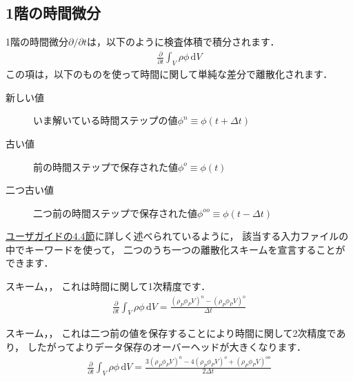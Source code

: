 \subsection{1階の時間微分}
\label{ssec:2.4.3}
%
1階の時間微分$\partial/\partial t$は，以下のように検査体積で積分されます．
\begin{align}
 \label{eq:2.20}
 \frac{\partial}{\partial t}\int_{V}\rho\phi\,\mathrm{d}V
\end{align}
この項は，以下のものを使って時間に関して単純な差分で離散化されます．
\begin{description}
 \item[新しい値] いま解いている時間ステップの値$\phi^{n} \equiv \phi(t + \Delta t)$
 \item[古い値] 前の時間ステップで保存された値$\phi^{o} \equiv \phi(t)$
 \item[二つ古い値] 二つ前の時間ステップで保存された値$\phi^{oo} \equiv \phi(t - \Delta t)$
\end{description}
\href{UserGuideJa.pdf#section.4.4}{ユーザガイドの4.4節}に詳しく述べられているように，
該当する入力ファイルの中でキーワードを使って，
二つのうち一つの離散化スキームを宣言することができます．
\begin{description}
%
%
 \item[オイラーの陰解法] スキーム，，
            これは時間に関して1次精度です．
            \begin{align}
             \label{eq:2.21}
             \frac{\partial}{\partial t}\int_{V}\rho\phi\,\mathrm{d}V
             = \frac{(\rho_{P}\phi_{P}V)^{n} - (\rho_{P}\phi_{P}V)^{o}}{\Delta t}
            \end{align}
%
%
\item[後退差分] スキーム，，
            これは二つ前の値を保存することにより時間に関して2次精度であり，
            したがってよりデータ保存のオーバーヘッドが大きくなります．
            \begin{align}
             \label{eq:2.22}
             \frac{\partial}{\partial t}\int_{V}\rho\phi\,\mathrm{d}V
             = \frac{3(\rho_{P}\phi_{P}V)^{n} - 4(\rho_{P}\phi_{P}V)^{o}
             + (\rho_{P}\phi_{P}V)^{oo}}{2\Delta t}
            \end{align}
\end{description}


